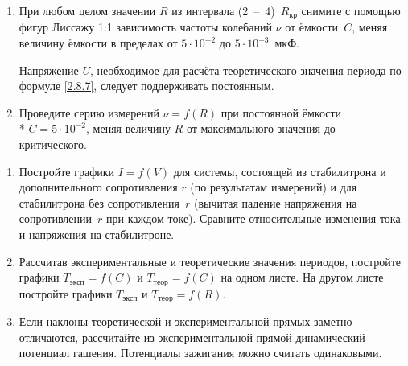 \begin{lab:task}
\begin{enumerate}
Получите и зарисуйте фигуры Лиссажу при увеличении частоты ЗГ в два и три раза (1:2 и 1:3).

		\item При любом целом значении $R$ из интервала (2~--~4)~$R_{\text{кр}}$ снимите с помощью фигур Лиссажу 1:1 зависимость частоты
колебаний $\nu$ от ёмкости~$C$, меняя величину ёмкости в пределах от $5\cdot10^{-2}$ до $5\cdot10^{-3}$~мкФ.

Напряжение $U$, необходимое для расчёта теоретического значения периода по формуле \eqref{2.8.7}, следует поддерживать
постоянным.

		\item Проведите серию измерений $\nu=f(R)$ при постоянной ёмкости\\* $C=5\cdot10^{-2}$, меняя величину $R$ от максимального
значения до критического.
	\end{enumerate}
	
	\begin{enumerate}

		\item Постройте графики $I=f(V)$ для системы, состоящей из стабилитрона и дополнительного сопротивления $r$ (по результатам
измерений) и для стабилитрона без сопротивления~$r$ (вычитая падение напряжения на сопротивлении~$r$ при каждом токе).
Сравните относительные изменения тока и напряжения на стабилитроне.

		\item Рассчитав экспериментальные и теоретические значения периодов, постройте графики $T_{\text{эксп}}=f(C)$ и $T_{\text{теор}}=f(C)$ на
одном листе.
На другом листе постройте графики $T_{\text{эксп}}$ и $T_{\text{теор}}=f(R)$.

		\item Если наклоны теоретической и экспериментальной прямых заметно отличаются, рассчитайте из экспериментальной прямой
динамический потенциал гашения. Потенциалы зажигания можно считать одинаковыми.
	\end{enumerate}
\end{lab:task}


